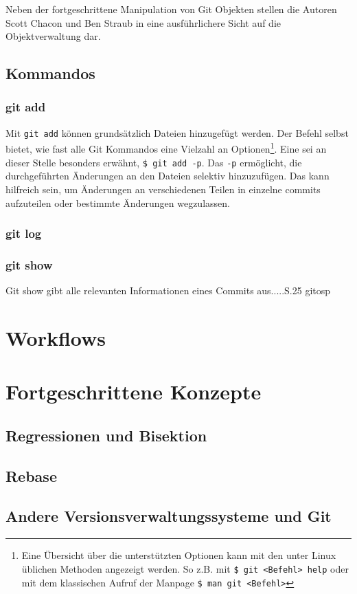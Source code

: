 Neben der fortgeschrittene Manipulation von Git Objekten stellen die Autoren
Scott Chacon und Ben Straub in \cite[S.~408-418]{progit} eine ausführlichere
Sicht auf die Objektverwaltung dar.

\subsection{Kommandos}\label{sec:commands}

\subsubsection{git add}\label{sec:gitadd}
Mit \texttt{git add} können grundsätzlich Dateien hinzugefügt werden. Der
Befehl selbst bietet, wie fast alle Git Kommandos eine Vielzahl an
Optionen\footnote{Eine Übersicht über die unterstützten Optionen kann mit den
unter Linux üblichen Methoden angezeigt werden. So z.B. mit \texttt{\$ git <Befehl>
help} oder mit dem klassischen Aufruf der Manpage \texttt{\$ man git <Befehl>}}.
Eine sei an dieser Stelle besonders erwähnt, \texttt{\$ git add -p}. Das
\texttt{-p} ermöglicht, die durchgeführten Änderungen an den Dateien selektiv
hinzuzufügen. Das kann hilfreich sein, um Änderungen an verschiedenen Teilen in
einzelne \glspl{commit} aufzuteilen oder bestimmte Änderungen wegzulassen.

\subsubsection{git log}\label{sec:gitlog}
\subsubsection{git show}\label{sec:gitshow}
Git show gibt alle relevanten Informationen eines Commits aus.....S.25 gitosp

\section{Workflows}
\label{sec:Workflows}
\section{Fortgeschrittene Konzepte}
\label{sec:FortgeschritteneKonzepte}
\subsection{Regressionen und Bisektion}\label{sec:bisec}
\subsection{Rebase}\label{sec:rebase}
\subsection{Andere Versionsverwaltungssysteme und Git}
\label{sec:AndereVersionsverwaltungssystemeundGit}
